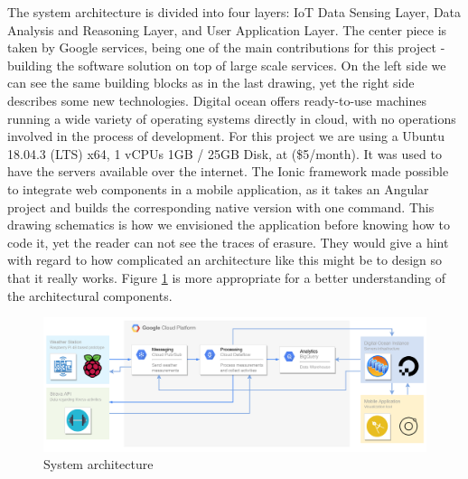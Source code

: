 The system architecture is divided into four layers: IoT Data Sensing Layer, Data Analysis and Reasoning Layer, and User Application Layer. The center piece is taken by Google services, being one of the main contributions for this project - building the software solution on top of large scale services. On the left side we can see the same building blocks as in the last drawing, yet the right side describes some new technologies. Digital ocean offers ready-to-use machines running a wide variety of operating systems directly in cloud, with no operations involved in the process of development. For this project we are using a Ubuntu 18.04.3 (LTS) x64, 1 vCPUs 1GB / 25GB Disk, at (\$5/month). It was used to have the servers available over the internet. The Ionic framework made possible to integrate web components in a mobile application, as it takes an Angular project and builds the corresponding native version with one command. This drawing schematics is how we envisioned the application before knowing how to code it, yet the reader can not see the traces of erasure. They would give a hint with regard to how complicated an architecture like this might be to design so that it really works. Figure \ref{fig:system_achitecture_diagram} is more appropriate for a better understanding of the architectural components.

\begin{figure}[!htb]
    \centering
    \includegraphics[width = 15.5cm]{figures/arch}
    \caption{System architecture}
    \label{fig:system_achitecture_diagram}
\end{figure}

